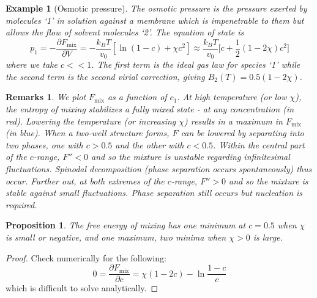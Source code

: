 \documentclass[a4paper]{article}
\newtheorem{eg}{Example}[section]
\newtheorem{remarks}{Remarks}[section]
\theoremstyle{new}
\newtheorem{prop}{Proposition}[section]
\begin{document}
\begin{eg}[Osmotic pressure]
The osmotic pressure is the pressure exerted by molecules `1' in solution against a membrane which is impenetrable to them but allows the flow of solvent molecules `2'. The equation of state is
$$p_1=-\frac{\partial F_{\text{mix}}}{\partial V}=-\frac{k_BT}{v_0}[\ln(1-c)+\chi c^2]\approx\frac{k_BT}{v_0}\bigg[c+\frac{1}{2}(1-2\chi)c^2\bigg]$$
where we take $c<<1$. The first term is the ideal gas law for species `1' while the second term is the second virial correction, giving $B_2(T)=0.5(1-2\chi)$.
\end{eg}
\begin{remarks}
We plot $F_{\text{mix}}$ as a function of $c_1$. At high temperature (or low $\chi$), the entropy of mixing stabilizes a fully mixed state - at any concentration (in red). Lowering the temperature (or increasing $\chi$) results in a maximum in $F_{\text{mix}}$ (in blue). When a two-well structure forms, $F$ can be lowered by separating into two phases, one with $c>0.5$ and the other with $c<0.5$. Within the central part of the $c$-range, $F''<0$ and so the mixture is unstable regarding infinitesimal fluctuations. Spinodal decomposition (phase separation occurs spontaneously) thus occur. Further out, at both extremes of the $c$-range, $F''>0$ and so the mixture is stable against small fluctuations. Phase separation still occurs but nucleation is required.
\begin{center}
\end{center}
\end{remarks}
\begin{prop}
The free energy of mixing has one minimum at $c=0.5$ when $\chi$ is small or negative, and one maximum, two minima when $\chi>0$ is large.
\end{prop}
\begin{proof}
Check numerically for the following:
$$0=\frac{\partial F_{\text{mix}}}{\partial c}=\chi(1-2c)-\ln\frac{1-c}{c}$$
which is difficult to solve analytically.
\end{proof}
\end{document}
